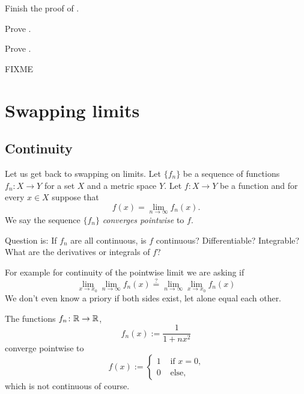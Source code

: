 \begin{exercise}
Finish the proof of .
\end{exercise}

\begin{exercise}
Prove .
\end{exercise}

\begin{exercise}
Prove .
\end{exercise}

FIXME



\sectionnewpage
\section{Swapping limits}
\label{sec:FIXME}


\subsection{Continuity}

Let us get back to swapping on limits.  Let $\{ f_n \}$ be a sequence
of functions $f_n \colon X \to Y$ for a set $X$ and a metric space $Y$.
Let $f \colon X \to Y$ be a
function and for every $x \in X$ suppose that
\begin{equation*}
f(x) = \lim_{n\to \infty} f_n(x) .
\end{equation*}
We say the sequence $\{ f_n \}$ \emph{converges pointwise} to
$f$.

Question is:
If $f_n$ are all continuous, is $f$ continuous?  Differentiable?
Integrable?  What are the derivatives or integrals of $f$?

For example for continuity of the pointwise limit we are asking if
\begin{equation*}
\lim_{x\to x_0} \lim_{n\to\infty} f_n(x)
\overset{?}{=}
\lim_{n\to\infty} \lim_{x\to x_0} f_n(x)
\end{equation*}
We don't even know a priory if both sides exist, let alone equal each other.

\begin{example}
The functions $f_n \colon {\mathbb{R}} \to {\mathbb{R}}$,
\begin{equation*}
f_n(x) := \frac{1}{1+nx^2}
\end{equation*}
converge pointwise to
\begin{equation*}
f(x) := 
\begin{cases}
1 & \text{ if $x=0$,} \\
0 & \text{ else,}
\end{cases}
\end{equation*}
which is not continuous of course.
\end{example}

